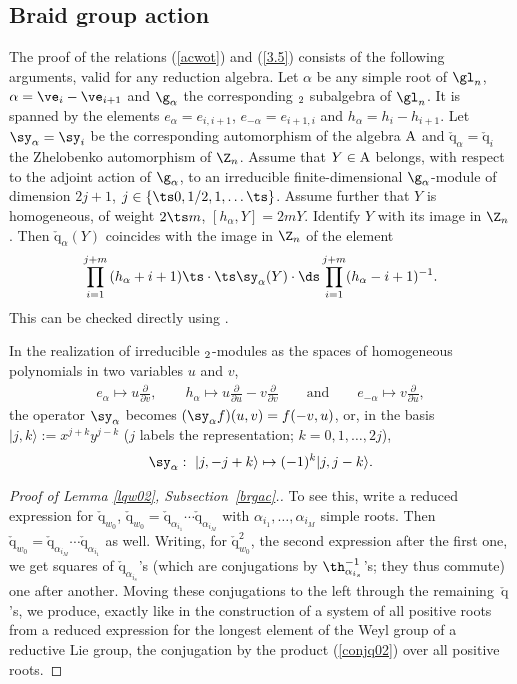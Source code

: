 \documentclass[pdftex]{sigma}
\def\a{\alpha}\def\Ar{{\rm A}}\def\Ab{\bar{\rm A}}\def\b{\beta}\def\bb{\mathfrak{b}}
\def\q{\check{\mathrm q}}\def\Q{\mathrm{Q}}\def\r#1{(\ref{#1})}\let\rf=\r
\numberwithin{equation}{section}
\begin{document}
\subsection{Braid group action}

The proof of the relations \rf{acwot} and \rf{3.5} consists of the following arguments, valid for any
reduction algebra. Let $\a$ be any simple root of $\gl_n$, $\a=\ve_i-\ve_{i+1}$ and $\g_\a$ the
corresponding $\sl_2$ subalgebra of $\gl_n$. It is spanned by the elements $e_\a=e_{i,i+1}$,
$e_{-\a}= e_{i+1,i}$ and $h_\a= h_i-h_{i+1}$. Let $\sy_\a=\sy_i$ be the corresponding
automorphism of the algebra $\Ar$ and $\q_\a=\q_i$ the Zhelobenko automorphism of
$\Z_n$. Assume that $Y\in\Ar$ belongs, with respect to the adjoint action of $\g_\a$, to an irreducible
f\/inite-dimensional $\g_\a$-module of dimension $2j+1$, $j\in\{\ts0,1/2,1,\ldots\ts\}$. Assume further
that $Y$ is homogeneous, of weight $2\ts m$, $[h_\a,Y]=2m Y$. Identify $Y$ with its image in $\Z_n$. Then
$\q_\a(Y)$ coincides with the image in $\Z_n$ of the element
\begin{gather*}%
\prod_{i=1}^{j+m}\,(h_\a+i+1)\ts\cdot\ts\sy_\alpha(Y)\cdot
{\ds\prod_{i=1}^{j+m} (h_\a-i+1)^{-1}}  .
\end{gather*}
This can be checked directly using \cite[Proposition 6.5]{KO}.


In the realization of irreducible $\sl_2$-modules as the spaces of homogeneous polynomials in two
variables $u$ and $v$,
\begin{gather*}e_\a\mapsto u\frac{\partial}{\partial v}  , \qquad h_\a\mapsto u\frac{\partial}{\partial u}-v\frac{\partial}{\partial v}
\qquad {\mathrm{and}}\qquad  e_{-\a}\mapsto v\frac{\partial}{\partial u}  ,
\end{gather*}
the operator $\sy_\alpha$ becomes $(\sy_\alpha f)(u,v)=f(-v,u)$, or, in the basis $|j,k\rangle :=x^{j+k}y^{j-k}$ ($j$ labels the
representation; $k=0,1,\dots ,2j$),
\begin{gather*}\sy_\alpha : \  |j,-j+k\rangle\mapsto (-1)^k |j,j-k\rangle  .\end{gather*}

\begin{proof}[Proof  of Lemma \ref{lqw02}, Subsection~\ref{brgac}.] %
To see this, write a reduced expression for $\q_{w_0}$, $\q_{w_0}=\q_{\alpha_{i_1}}\cdots \q_{\alpha_{i_M}}$
with $\alpha_{i_1},\dots ,\alpha_{i_M}$ simple roots. Then $\q_{w_0}=\q_{\alpha_{i_M}}\cdots \q_{\alpha_{i_1}}$ as well.
Writing, for $\q_{w_0}^2$, the second expression after the f\/irst one, we get squares of
$\q_{\alpha_{i_s}}$'s (which are conjugations by $\th_{\alpha_{i_s}}^{-1}$'s; they thus commute) one after another.
Moving these conjugations to the left through the remaining~$\q$'s, we produce, exactly like in the
construction of a system of all positive roots from a reduced expression for
the longest element of the Weyl group of a reductive Lie group, the conjugation by the product (\ref{conjq02})
over all positive roots.
\end{proof}
\end{document}
